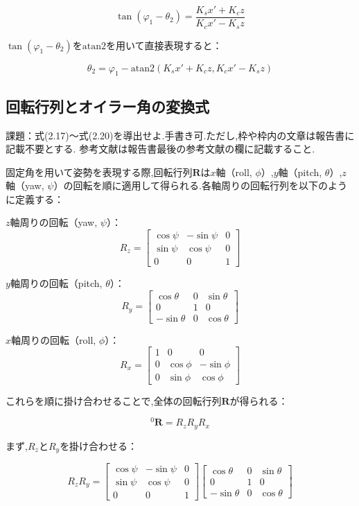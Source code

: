\[
  \tan(\varphi_1 - \theta_2) = \frac{K_s x' + K_c z}{K_c x' - K_s z}
\]

$\tan(\varphi_1 - \theta_2)$を$\text{atan2}$を用いて直接表現すると：

\[
  \theta_2 = \varphi_1 - \text{atan2}\left( K_s x' + K_c z, K_c x' - K_s z \right) \tag{2.14}
\]

\subsection{回転行列とオイラー角の変換式}
課題：式(2.17)～式(2.20)を導出せよ.手書き可.ただし,枠や枠内の文章は報告書に記載不要とする.
参考文献は報告書最後の参考文献の欄に記載すること.

固定角を用いて姿勢を表現する際,回転行列$\mathbf{R}$は$x$軸（roll, $\phi$）,$y$軸（pitch, $\theta$）,$z$軸（yaw, $\psi$）の回転を順に適用して得られる.各軸周りの回転行列を以下のように定義する：

$z$軸周りの回転（yaw, $\psi$）：
\[
  R_z = \begin{bmatrix} 
    \cos \psi & -\sin \psi & 0  \\ 
    \sin \psi & \cos \psi  & 0  \\ 
    0         & 0          & 1 
  \end{bmatrix}
\]

$y$軸周りの回転（pitch, $\theta$）：
\[
  R_y = \begin{bmatrix} 
    \cos \theta  & 0 & \sin \theta  \\ 
    0            & 1 & 0            \\ 
    -\sin \theta & 0 & \cos \theta 
  \end{bmatrix}
\]

$x$軸周りの回転（roll, $\phi$）：
\[
  R_x = \begin{bmatrix} 
    1 & 0         & 0          \\ 
    0 & \cos \phi & -\sin \phi \\ 
    0 & \sin \phi & \cos \phi 
  \end{bmatrix}
\]

これらを順に掛け合わせることで,全体の回転行列$\mathbf{R}$が得られる：

\[
  ^0\mathbf{R} = R_z R_y R_x
\]

まず,$R_z$と$R_y$を掛け合わせる：

\[
  R_z R_y = \begin{bmatrix} 
    \cos \psi & -\sin \psi & 0  \\ 
    \sin \psi & \cos \psi  & 0  \\ 
    0         & 0          & 1 
  \end{bmatrix}
  \begin{bmatrix} 
    \cos \theta  & 0 & \sin \theta  \\ 
    0            & 1 & 0            \\ 
    -\sin \theta & 0 & \cos \theta 
  \end{bmatrix}
\]


